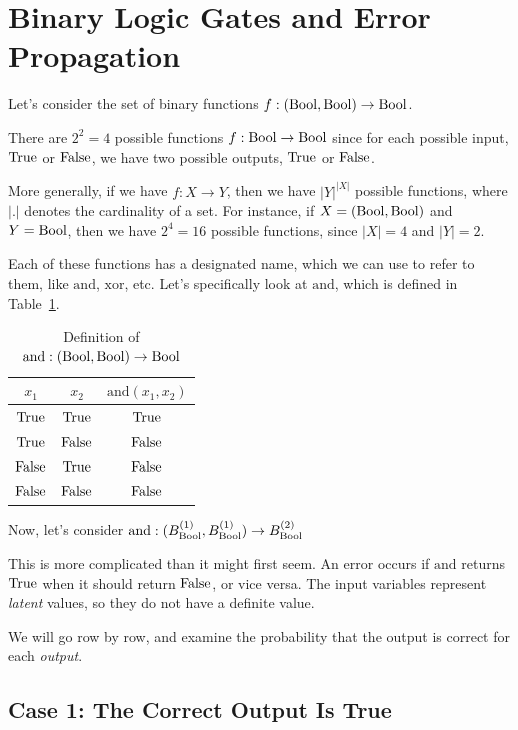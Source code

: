 \documentclass[../main.tex]{subfiles}
\begin{document}
\section{Binary Logic Gates and Error Propagation}
\label{sec:logic_gates}

Let's consider the set of binary functions
$f : (\mathrm{Bool}, \mathrm{Bool}) \to \mathrm{Bool}$.

There are $2^2 = 4$ possible functions $f : \mathrm{Bool} \to \mathrm{Bool}$ since for each possible
input, $\mathrm{True}$ or $\mathrm{False}$, we have two possible outputs, $\mathrm{True}$ or $\mathrm{False}$.

More generally, if we have $f : X \to Y$, then we have $|Y|^{|X|}$ possible functions,
where $|.|$ denotes the cardinality of a set. For instance, if $X = (\mathrm{Bool}, \mathrm{Bool})$
and $Y = \mathrm{Bool}$, then we have $2^4 = 16$ possible functions, since $|X| = 4$ and $|Y| = 2$.

Each of these functions has a designated name, which we can use to refer to them,
like $\mathrm{and}$, $\mathrm{xor}$, etc. Let's specifically look at $\mathrm{and}$, which is defined in Table~\ref{tbl:and_function}.

\begin{table}[htbp]
\centering
\caption{Definition of $\mathrm{and} : (\mathrm{Bool}, \mathrm{Bool}) \to \mathrm{Bool}$}
\label{tbl:and_function}
\begin{tabular}{@{}ccc@{}}
\toprule
$x_1$ & $x_2$ & $\mathrm{and}(x_1, x_2)$ \\
\midrule
$\mathrm{True}$ & $\mathrm{True}$ & $\mathrm{True}$ \\
$\mathrm{True}$ & $\mathrm{False}$ & $\mathrm{False}$ \\
$\mathrm{False}$ & $\mathrm{True}$ & $\mathrm{False}$ \\
$\mathrm{False}$ & $\mathrm{False}$ & $\mathrm{False}$ \\
\bottomrule
\end{tabular}
\end{table}

Now, let's consider
$\mathrm{and} : (B_{\mathrm{Bool}}^{(1)}, B_{\mathrm{Bool}}^{(1)}) \to B_{\mathrm{Bool}}^{(2)}$

This is more complicated than it might first seem. An error occurs if $\mathrm{and}$ returns $\mathrm{True}$ when it should return $\mathrm{False}$, or vice versa. The input variables represent \emph{latent} values, so they do not have a definite value.

We will go row by row, and examine the probability that the output is correct for each \emph{output}.

\subsection{Case 1: The Correct Output Is True}
\end{document}
